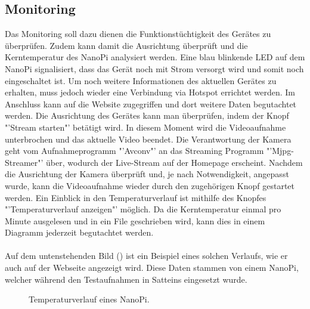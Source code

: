 \subsection{Monitoring}
Das Monitoring soll dazu dienen die Funktionstüchtigkeit des Gerätes zu überprüfen. Zudem kann damit die Ausrichtung überprüft und die Kerntemperatur des NanoPi analysiert werden. Eine blau blinkende LED auf dem NanoPi signalisiert, dass das Gerät noch mit Strom versorgt wird und somit noch eingeschaltet ist. Um noch weitere Informationen des aktuellen Gerätes zu erhalten, muss jedoch wieder eine Verbindung via Hotspot errichtet werden. Im Anschluss kann auf die Website zugegriffen und dort weitere Daten begutachtet werden. Die Ausrichtung des Gerätes kann man überprüfen, indem der Knopf "'Stream starten"' betätigt wird. In diesem Moment wird die Videoaufnahme unterbrochen und das aktuelle Video beendet. Die Verantwortung der Kamera geht vom Aufnahmeprogramm "'Avconv"' an das Streaming Programm "'Mjpg-Streamer"' über, wodurch der Live-Stream auf der Homepage erscheint. Nachdem die Ausrichtung der Kamera überprüft und, je nach Notwendigkeit, angepasst wurde, kann die Videoaufnahme wieder durch den zugehörigen Knopf gestartet werden. Ein Einblick in den Temperaturverlauf ist mithilfe des Knopfes "'Temperaturverlauf anzeigen"' möglich. Da die Kerntemperatur einmal pro Minute ausgelesen und in ein File geschrieben wird, kann dies in einem Diagramm jederzeit begutachtet werden. \\\\
Auf dem untenstehenden Bild () ist ein Beispiel eines solchen Verlaufs, wie er auch auf der Webseite angezeigt wird. Diese Daten stammen von einem NanoPi, welcher während den Testaufnahmen in Satteins eingesetzt wurde.

\begin{figure}[H]
  \centering
  \caption{Temperaturverlauf eines NanoPi.}
  \label{bTemperature}
\end{figure} 